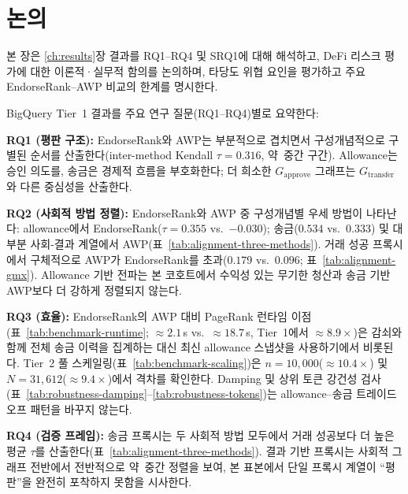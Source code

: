 
\chapter{논의}
\label{ch:discussion}

본 장은 \ref{ch:results}장 결과를 RQ1--RQ4 및 SRQ1에 대해 해석하고, DeFi 리스크 평가에 대한 이론적·실무적 함의를 논의하며, 타당도 위협 요인을 평가하고 주요 EndorseRank--AWP 비교의 한계를 명시한다.


BigQuery Tier~1 결과를 주요 연구 질문(RQ1--RQ4)별로 요약한다:

\textbf{RQ1 (평판 구조):} EndorseRank와 AWP는 부분적으로 겹치면서 구성개념적으로 구별된 순서를 산출한다(inter-method Kendall $\tau = 0.316$, 약~중간 구간). Allowance는 승인 의도를, 송금은 경제적 흐름을 부호화한다; 더 희소한 $G_{\text{approve}}$ 그래프는 $G_{\text{transfer}}$와 다른 중심성을 산출한다.

\textbf{RQ2 (사회적 방법 정렬):} EndorseRank와 AWP 중 구성개념별 우세 방법이 나타난다: allowance에서 EndorseRank($\tau=0.355$ vs.\ $-0.030$); 송금($0.534$ vs.\ $0.333$) 및 대부분 사회-결과 계열에서 AWP(표~\ref{tab:alignment-three-methods}). 거래 성공 프록시에서 구체적으로 AWP가 EndorseRank를 초과($0.179$ vs.\ $0.096$; 표~\ref{tab:alignment-gmx}). Allowance 기반 전파는 본 코호트에서 수익성 있는 무기한 청산과 송금 기반 AWP보다 더 강하게 정렬되지 않는다.

\textbf{RQ3 (효율):} EndorseRank의 AWP 대비 PageRank 런타임 이점(표~\ref{tab:benchmark-runtime}; $\approx 2.1$\,s vs.\ $\approx 18.7$\,s, Tier~1에서 $\approx 8.9\times$)은 감쇠와 함께 전체 송금 이력을 집계하는 대신 최신 allowance 스냅샷을 사용하기에서 비롯된다. Tier~2 풀 스케일링(표~\ref{tab:benchmark-scaling})은 $n=10{,}000$($\approx 10.4\times$) 및 $N=31{,}612$($\approx 9.4\times$)에서 격차를 확인한다. Damping 및 상위 토큰 강건성 검사(표~\ref{tab:robustness-damping}--\ref{tab:robustness-tokens})는 allowance--송금 트레이드오프 패턴을 바꾸지 않는다.

\textbf{RQ4 (검증 프레임):} 송금 프록시는 두 사회적 방법 모두에서 거래 성공보다 더 높은 평균 $\tau$를 산출한다(표~\ref{tab:alignment-three-methods}). 결과 기반 프록시는 사회적 그래프 전반에서 전반적으로 약~중간 정렬을 보여, 본 표본에서 단일 프록시 계열이 ``평판''을 완전히 포착하지 못함을 시사한다.


